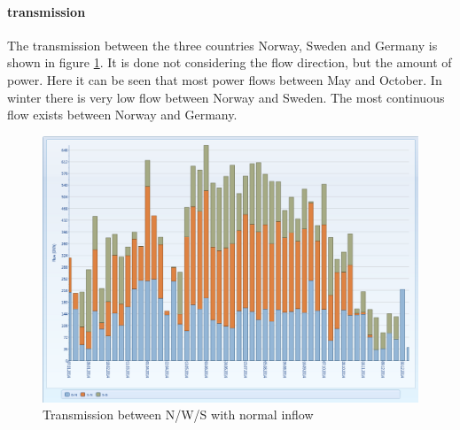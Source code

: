 \documentclass{article}
\begin{document}
\paragraph{transmission\\}
The transmission between the three countries Norway, Sweden and Germany is shown in figure \ref{fig:MTnodetransmissionnormal}. It is done not considering the flow direction, but the amount of power. Here it can be seen that most power flows between May and October. In winter there is very low flow between Norway and Sweden. The most continuous flow exists between Norway and Germany.
\begin{figure}[htbp]
\begin{center}
\includegraphics[width=13cm,keepaspectratio=true]{figures/MTnodetransmission}
\caption{Transmission between N/W/S with normal inflow}
\label{fig:MTnodetransmissionnormal}
\end{center}
\end{figure}
\end{document}
